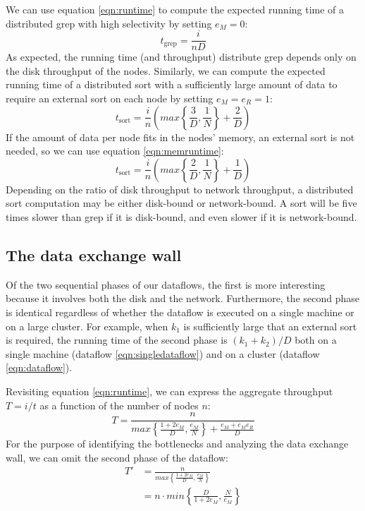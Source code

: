 \documentclass{acm_proc_article-sp}
\begin{document}
We can use equation \ref{eqn:runtime} to compute the expected running time of a distributed grep with high selectivity by setting $e_M = 0$:
\begin{equation}
t_\text{grep} = \frac{i}{n D}
\end{equation}
As expected, the running time (and throughput) distribute grep depends only on the disk throughput of the nodes. Similarly, we can compute the expected running time of a distributed sort with a sufficiently large amount of data to require an external sort on each node by setting $e_M = e_R = 1$:
\begin{equation}
t_\text{sort} = \frac{i}{n} \left( max\left\{ \frac{3}{D}, \frac{1}{N} \right\} + \frac{2}{D} \right)
\end{equation}
If the amount of data per node fits in the nodes' memory, an external sort is not needed, so we can use equation \ref{eqn:memruntime}:
\begin{equation}
t_\text{sort} = \frac{i}{n} \left( max\left\{ \frac{2}{D}, \frac{1}{N} \right\} + \frac{1}{D} \right)
\end{equation}
Depending on the ratio of disk throughput to network throughput, a distributed sort computation may be either disk-bound or network-bound. A sort will be five times slower than grep if it is disk-bound, and even slower if it is network-bound.

\subsection{The data exchange wall}
Of the two sequential phases of our dataflows, the first is more interesting because it involves both the disk and the network. Furthermore, the second phase is identical regardless of whether the dataflow is executed on a single machine or on a large cluster. For example, when $k_1$ is sufficiently large that an external sort is required, the running time of the second phase is $(k_1 + k_2)/D$ both on a single machine (dataflow \ref{eqn:singledataflow}) and on a cluster (dataflow \ref{eqn:dataflow}).

Revisiting equation \ref{eqn:runtime}, we can express the aggregate throughput $T = i/t$ as a function of the number of nodes $n$:
\begin{equation}
T = \frac{n}{max\left\{ \frac{1 + 2 e_M}{D}, \frac{e_M}{N} \right\} + \frac{e_M + e_M e_R}{D}}
\label{eqn:throughput}
\end{equation}
For the purpose of identifying the bottlenecks and analyzing the data exchange wall, we can omit the second phase of the dataflow:
\begin{align}
T' &= \frac{n}{max\left\{ \frac{1 + 2 e_M}{D}, \frac{e_M}{N} \right\}}\\
  &= n \cdot min\left\{ \frac{D}{1 + 2 e_M}, \frac{N}{e_M} \right\}
\label{eqn:phase1throughput}
\end{align}
\end{document}
